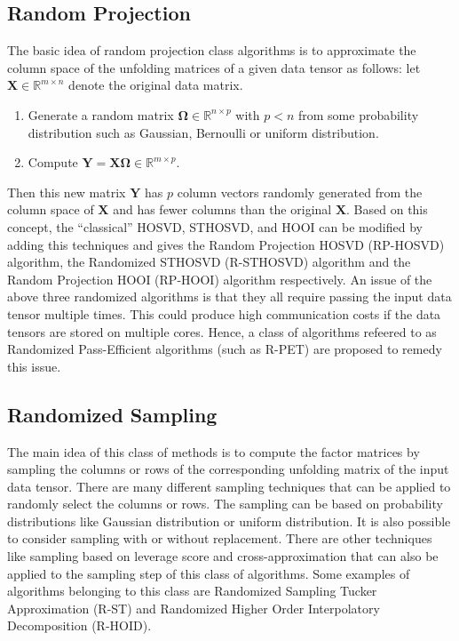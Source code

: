 \documentclass[preprint]{elsarticle}
\begin{document}
\subsection{Random Projection}
\noindent The basic idea of random projection class algorithms is to approximate the column space of the unfolding matrices of a given data tensor
as follows: let $\mathbf{X}\in\mathbb{R}^{m\times n}$ denote the original data matrix.
\begin{enumerate}
    \item Generate a random matrix $\mathbf{\Omega}\in\mathbb{R}^{n\times p}$ with $p<n$ from some probability distribution such as 
    Gaussian, Bernoulli or uniform distribution.
    \item Compute $\mathbf{Y}=\mathbf{X}\mathbf{\Omega}\in\mathbb{R}^{m\times p}$.
\end{enumerate}
Then this new matrix $\mathbf{Y}$ has $p$ column vectors randomly generated from the column space of $\mathbf{X}$ and has 
fewer columns than the original $\mathbf{X}$.
\vskip 0.3cm
\noindent Based on this concept, the ``classical'' HOSVD, STHOSVD, and HOOI can be modified by adding this techniques and gives
the Random Projection HOSVD (RP-HOSVD) algorithm, the Randomized STHOSVD (R-STHOSVD) algorithm and the Random Projection HOOI (RP-HOOI)
algorithm respectively. An issue of the above three randomized algorithms is that they all require passing the input data tensor multiple times.
This could produce high communication costs if the data tensors are stored on multiple cores. Hence, a class of algorithms refeered to as
Randomized Pass-Efficient algorithms (such as R-PET) are proposed to remedy this issue.
\subsection{Randomized Sampling}
\noindent The main idea of this class of methods is to compute the factor matrices by sampling the columns or rows
of the corresponding unfolding matrix of the input data tensor. There are many different sampling techniques that can
be applied to randomly select the columns or rows. The sampling can be based on probability distributions like
Gaussian distribution or uniform distribution. It is also possible to consider sampling with or without replacement.
There are other techniques like sampling based on leverage score and cross-approximation that can also be applied to the
sampling step of this class of algorithms. Some examples of algorithms belonging to this class are
Randomized Sampling Tucker Approximation (R-ST) and Randomized Higher Order Interpolatory Decomposition (R-HOID).
\end{document}
